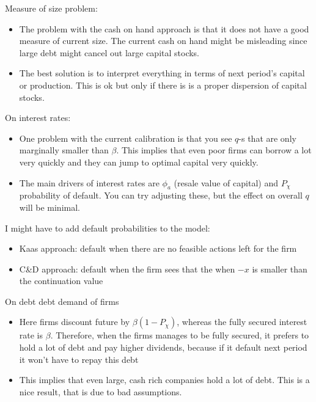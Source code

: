 \documentclass[12pt]{article}
\begin{document}
Measure of size problem: 
\begin{itemize}\setlength{\itemsep}{0pt}
    \item The problem with the cash on hand approach is that it does not have a good measure of current size. The current cash on hand might be misleading since large debt might cancel out large capital stocks.
    \item The best solution is to interpret everything in terms of next period's capital or production. This is ok but only if there is is a proper dispersion of capital stocks.
\end{itemize} 
On interest rates:
\begin{itemize}\setlength{\itemsep}{0pt}
    \item One problem with the current calibration is that you see $q$-s that are only marginally smaller than $\beta$. This implies that even poor firms can borrow a lot very quickly and they can jump to optimal capital very quickly. 
    \item The main drivers of interest rates are $\phi_a$ (resale value of capital) and $P_{\chi}$ probability of default. You can try adjusting these, but the effect on overall $q$ will be minimal. 
\end{itemize}
I might have to add default probabilities to the model:
\begin{itemize}\setlength{\itemsep}{0pt}
    \item Kaas approach: default when there are no feasible actions left for the firm 
    \item C\&D approach: default when the firm sees that the when $-x$ is smaller than the continuation value
\end{itemize}
On debt debt demand of firms
\begin{itemize}\setlength{\itemsep}{0pt}
    \item Here firms discount future by $\beta(1-P_\chi)$, whereas the fully secured interest rate is $\beta$. Therefore, when the firms manages to be fully secured, it prefers to hold a lot of debt and pay higher dividends, because if it default next period it won't have to repay this debt
    \item This implies that even large, cash rich companies hold a lot of debt. This is a nice result, that is due to bad assumptions. 
\end{itemize}
\end{document}
